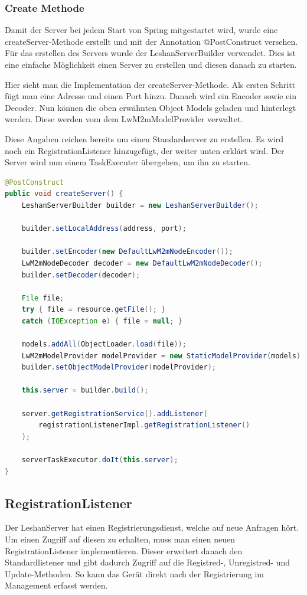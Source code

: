 \subsubsection{Create Methode}
Damit der Server bei jedem Start von Spring mitgestartet wird, wurde eine createServer-Methode erstellt und mit der Annotation @PostConstruct versehen. Für das erstellen des Servers wurde der LeshanServerBuilder verwendet. Dies ist eine einfache Möglichkeit einen Server zu erstellen und diesen danach zu starten.

Hier sieht man die Implementation der createServer-Methode. Als ersten Schritt fügt man eine Adresse und einen Port hinzu. Danach wird ein Encoder sowie ein Decoder. Nun können die oben erwähnten Object Models geladen und hinterlegt werden. Diese werden vom dem LwM2mModelProvider verwaltet.

Diese Angaben reichen bereits um einen Standardserver zu erstellen. Es wird noch ein RegistrationListener hinzugefügt, der weiter unten erklärt wird. Der Server wird nun einem TaskExecuter übergeben, um ihn zu starten.

\begin{lstlisting}[language=java]
@PostConstruct
public void createServer() {
	LeshanServerBuilder builder = new LeshanServerBuilder();

	builder.setLocalAddress(address, port);
		
	builder.setEncoder(new DefaultLwM2mNodeEncoder());
	LwM2mNodeDecoder decoder = new DefaultLwM2mNodeDecoder();
	builder.setDecoder(decoder);

	File file;
	try { file = resource.getFile(); } 
	catch (IOException e) { file = null; }

	models.addAll(ObjectLoader.load(file));
	LwM2mModelProvider modelProvider = new StaticModelProvider(models);
	builder.setObjectModelProvider(modelProvider);

	this.server = builder.build();
		
	server.getRegistrationService().addListener(
		registrationListenerImpl.getRegistrationListener()
	);
		
	serverTaskExecutor.doIt(this.server);
}
\end{lstlisting}
 
\subsection{RegistrationListener}
Der LeshanServer hat einen Registrierungsdienst, welche auf neue Anfragen hört. Um einen Zugriff auf diesen zu erhalten, muss man einen neuen RegistrationListener implementieren. Dieser erweitert danach den Standardlistener und gibt dadurch Zugriff auf die Registred-, Unregistred- und Update-Methoden. So kann das Gerät direkt nach der Registrierung im Management erfasst werden. 

